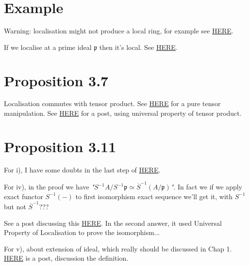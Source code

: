 
\section{Example}

Warning: localisation might not produce a local ring, for example see \href{https://math.stackexchange.com/questions/628371/a-f-is-not-a-local-ring}{HERE}.

If we localise at a prime ideal $\mathfrak p$ then it's local. See \href{https://math.stackexchange.com/questions/300446/why-is-the-localization-at-a-prime-ideal-a-local-ring#:~:text=Well%2C%20any%20proper%20ideal%20m,p%20is%20a%20local%20ring.}{HERE}.

\section{Proposition 3.7}

Localisation commutes with tensor product. See \href{http://sporadic.stanford.edu/math210a/sol4.pdf}{HERE} for a pure tensor manipulation. See \href{https://math.stackexchange.com/questions/2292960/localization-commutes-with-tensor-products}{HERE} for a post, using universal property of tensor product.

\section{Proposition 3.11}\label{Atiyah Chap 3 Prop 3.11.}

For i), I have some doubts in the last step of \href{https://math.stackexchange.com/questions/375353/every-ideal-of-the-localization-is-an-extended-ideal}{HERE}.

For iv), in the proof we have \textit{"$S^{-1}A/S^{-1}\mathfrak p\simeq \overline{S}^{-1}(A/\mathfrak p)$"}. In fact we if we apply exact functor $S^{-1}(-)$ to first isomorphism exact sequence we'll get it, with $S^{-1}$ but not $\overline{S}^{-1}$???

See a post discussing this \href{https://math.stackexchange.com/questions/1630232/localization-commutes-with-quotient}{HERE}. In the second answer, it used Universal Property of Localisation to prove the isomorphism...

For v), about extension of ideal, which really should be discussed in Chap 1.
\href{https://math.stackexchange.com/questions/367073/about-the-definition-of-extended-ideals}{HERE} is a post, discussion the definition.

